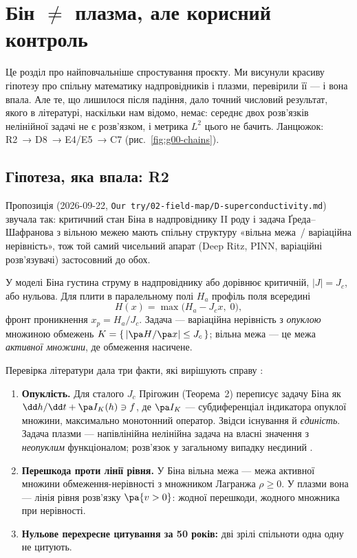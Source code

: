 \chapter{Бін \texorpdfstring{$\neq$}{≠} плазма, але корисний контроль}\label{ch:g03}

Це розділ про найповчальніше спростування проєкту. Ми висунули красиву гіпотезу про
спільну математику надпровідників і плазми, перевірили її --- і вона впала. Але те, що
лишилося після падіння, дало точний числовий результат, якого в літературі, наскільки
нам відомо, немає: середнє двох розв'язків нелінійної задачі не є розв'язком, і метрика
$L^2$ цього не бачить. Ланцюжок: R2~→ D8~→ E4/E5~→ C7 (рис.~\ref{fig:g00-chains}).

\section{Гіпотеза, яка впала: R2}\label{sec:g03-r2}

Пропозиція (2026-09-22, \texttt{Our try/02-field-map/D-superconductivity.md}) звучала так:
критичний стан Біна в надпровіднику II роду і задача Ґреда--Шафранова з вільною межею
мають спільну структуру «вільна межа~/ варіаційна нерівність», тож той самий чисельний
апарат (Deep Ritz, PINN, варіаційні розв'язувачі) застосовний до обох.

\begin{outofcorpus}
У моделі Біна густина струму в надпровіднику або дорівнює критичній, $|J|=J_c$, або
нульова. Для плити в паралельному полі $H_a$ профіль поля всередині
\[
H(x)=\max\bigl(H_a-J_c x,\;0\bigr),
\]
фронт проникнення $x_p=H_a/J_c$. Задача --- варіаційна нерівність з \emph{опуклою}
множиною обмежень $K=\{\,|{\pa H}/{\pa x}|\le J_c\,\}$; вільна межа --- це межа
\emph{активної множини}, де обмеження насичене.
\end{outofcorpus}

Перевірка літератури дала три факти, які вирішують справу \cite{RegEst,RegDec}:
\begin{enumerate}
\item \textbf{Опуклість.} Для сталого $J_c$ Прігожин \cite{Prigozhin1996} (Теорема~2)
  переписує задачу Біна як $\dd h/\dd t+\pa I_K(h)\ni f$, де $\pa I_K$ --- субдиференціал
  індикатора опуклої множини, максимально монотонний оператор. Звідси існування й
  \emph{єдиність}. Задача плазми --- напівлінійна нелінійна задача на власні значення з
  \emph{неопуклим} функціоналом; розв'язок у загальному випадку неєдиний \cite{Schaeffer1977,Bartolucci2021}.
\item \textbf{Перешкода проти лінії рівня.} У Біна вільна межа --- межа активної множини
  обмеження-нерівності з множником Лагранжа $\rho\ge0$. У плазми вона --- лінія рівня
  розв'язку $\pa\{v>0\}$: жодної перешкоди, жодного множника при нерівності.
\item \textbf{Нульове перехресне цитування за 50 років:} дві зрілі спільноти одна одну не
  цитують.
\end{enumerate}

